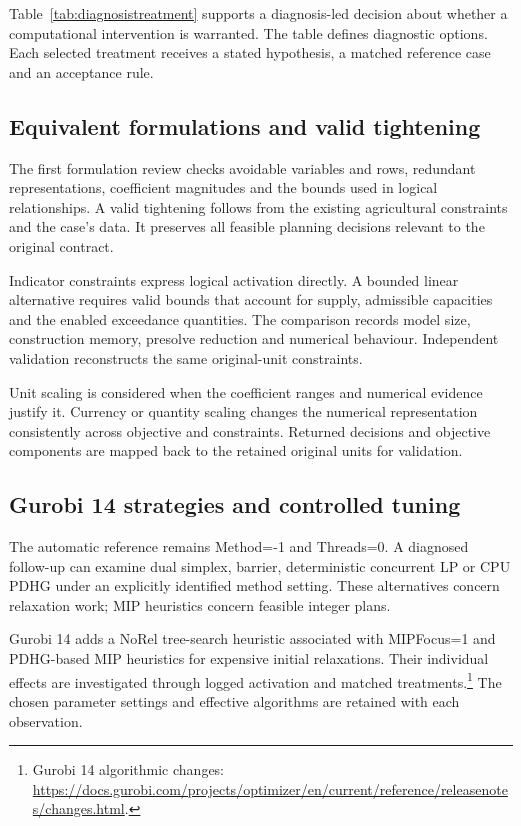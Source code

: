 \documentclass[11pt,a4paper]{article}
\newcommand{\technical}[2]{\footnote{#1: \url{#2}.}}
\begin{document}
Table~\ref{tab:diagnosistreatment} supports a diagnosis-led decision about whether a computational intervention is warranted. The table defines diagnostic options. Each selected treatment receives a stated hypothesis, a matched reference case and an acceptance rule.

\subsection{Equivalent formulations and valid tightening}

The first formulation review checks avoidable variables and rows, redundant representations, coefficient magnitudes and the bounds used in logical relationships. A valid tightening follows from the existing agricultural constraints and the case's data. It preserves all feasible planning decisions relevant to the original contract.

Indicator constraints express logical activation directly. A bounded linear alternative requires valid bounds that account for supply, admissible capacities and the enabled exceedance quantities. The comparison records model size, construction memory, presolve reduction and numerical behaviour. Independent validation reconstructs the same original-unit constraints.

Unit scaling is considered when the coefficient ranges and numerical evidence justify it. Currency or quantity scaling changes the numerical representation consistently across objective and constraints. Returned decisions and objective components are mapped back to the retained original units for validation.

\subsection{Gurobi 14 strategies and controlled tuning}

The automatic reference remains Method=-1 and Threads=0. A diagnosed follow-up can examine dual simplex, barrier, deterministic concurrent LP or CPU PDHG under an explicitly identified method setting. These alternatives concern relaxation work; MIP heuristics concern feasible integer plans.

Gurobi 14 adds a NoRel tree-search heuristic associated with MIPFocus=1 and PDHG-based MIP heuristics for expensive initial relaxations. Their individual effects are investigated through logged activation and matched treatments.\technical{Gurobi 14 algorithmic changes}{https://docs.gurobi.com/projects/optimizer/en/current/reference/releasenotes/changes.html} The chosen parameter settings and effective algorithms are retained with each observation.
\end{document}

